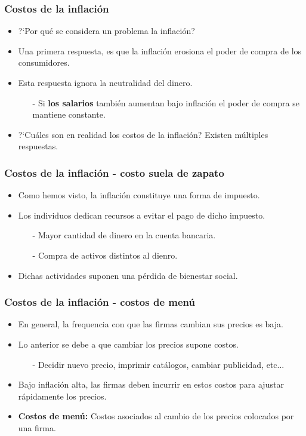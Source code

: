 \documentclass{beamer}
\begin{document}
\begin{frame}
\frametitle{Costos de la inflaci\'on}
\begin{itemize}
\setlength\itemsep{1.4em}
\item ?`Por qu\'e se considera un problema la inflaci\'on?
\item Una primera respuesta, es que la inflaci\'on erosiona el poder de compra de los consumidores.
\item Esta respuesta ignora la neutralidad del dinero.\\
\begin{itemize}
\item[-] Si \textbf{los salarios} tambi\'en aumentan bajo inflaci\'on el poder de compra se mantiene constante. 
\end{itemize}
\item ?`Cu\'ales son en realidad los costos de la inflaci\'on? Existen m\'ultiples respuestas.
\end{itemize}
\end{frame}

\begin{frame}
\frametitle{Costos de la inflaci\'on - costo suela de zapato}
\begin{itemize}
\setlength\itemsep{1.4em}
\item Como hemos visto, la inflaci\'on constituye una forma de impuesto.
\item Los individuos dedican recursos a evitar el pago de dicho impuesto.\\
\begin{itemize}
\setlength\itemsep{0.9em}
\item[-] Mayor cantidad de dinero en la cuenta bancaria.
\item[-] Compra de activos distintos al dienro.
\end{itemize}
\item Dichas actividades suponen una p\'erdida de bienestar social.
\end{itemize}
\end{frame}

\begin{frame}
\frametitle{Costos de la inflaci\'on - costos de men\'u}
\begin{itemize}
\setlength\itemsep{1.4em}
\item En general, la frequencia con que las firmas cambian sus precios es baja.
\item Lo anterior se debe a que cambiar los precios supone costos.\\
\begin{itemize}
\setlength\itemsep{0.9em}
\item[-] Decidir nuevo precio, imprimir cat\'alogos, cambiar publicidad, etc...
\end{itemize}
\item Bajo inflaci\'on alta, las firmas deben incurrir en estos costos para ajustar r\'apidamente los precios.
\item \textbf{Costos de men\'u:} Costos asociados al cambio de los precios colocados por una firma.
\end{itemize}
\end{frame}
\end{document}
